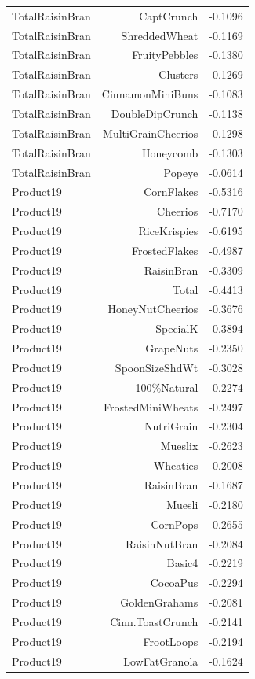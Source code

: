 \begin{longtable}{@{}lrr@{}}
TotalRaisinBran & CaptCrunch & -0.1096 \\
TotalRaisinBran & ShreddedWheat & -0.1169 \\
TotalRaisinBran & FruityPebbles & -0.1380 \\
TotalRaisinBran & Clusters & -0.1269 \\
TotalRaisinBran & CinnamonMiniBuns & -0.1083 \\
TotalRaisinBran & DoubleDipCrunch & -0.1138 \\
TotalRaisinBran & MultiGrainCheerios & -0.1298 \\
TotalRaisinBran & Honeycomb & -0.1303 \\
TotalRaisinBran & Popeye & -0.0614 \\
Product19 & CornFlakes & -0.5316 \\
Product19 & Cheerios & -0.7170 \\
Product19 & RiceKrispies & -0.6195 \\
Product19 & FrostedFlakes & -0.4987 \\
Product19 & RaisinBran & -0.3309 \\
Product19 & Total & -0.4413 \\
Product19 & HoneyNutCheerios & -0.3676 \\
Product19 & SpecialK & -0.3894 \\
Product19 & GrapeNuts & -0.2350 \\
Product19 & SpoonSizeShdWt & -0.3028 \\
Product19 & 100\%Natural & -0.2274 \\
Product19 & FrostedMiniWheats & -0.2497 \\
Product19 & NutriGrain & -0.2304 \\
Product19 & Mueslix & -0.2623 \\
Product19 & Wheaties & -0.2008 \\
Product19 & RaisinBran & -0.1687 \\
Product19 & Muesli & -0.2180 \\
Product19 & CornPops & -0.2655 \\
Product19 & RaisinNutBran & -0.2084 \\
Product19 & Basic4 & -0.2219 \\
Product19 & CocoaPus & -0.2294 \\
Product19 & GoldenGrahams & -0.2081 \\
Product19 & Cinn.ToastCrunch & -0.2141 \\
Product19 & FrootLoops & -0.2194 \\
Product19 & LowFatGranola & -0.1624 \\

\end{longtable}
